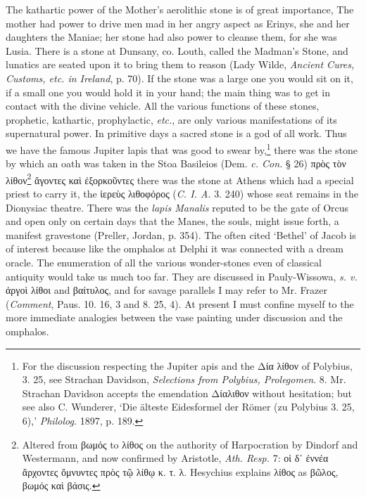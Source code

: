 \documentclass[a4paper, 11pt, oneside, polutonikogreek, english]{article}
\begin{document}
The kathartic power of the Mother's aerolithic stone is of great importance, The mother had power to drive men mad in her angry aspect as Erinys, she and her daughters the Maniae; her stone had also power to cleanse them, for she was Lusia. There is a stone at Dunsany, co. Louth, called the Madman's Stone, and lunatics are seated upon it to bring them to reason (Lady Wilde, \emph{Ancient Cures, Customs, etc. in Ireland}, p. 70). If the stone was a large one you would sit on it, if a small one you would hold it in your hand; the main thing was to get in contact with the divine vehicle. All the various functions of these stones, prophetic, kathartic, prophylactic, \emph{etc.}, are only various manifestations of its supernatural power. In primitive days a sacred stone is a god of all work. Thus we have the famous Jupiter lapis that was good to swear by,\footnote{For the discussion respecting the Jupiter apis and the Δία λίθον of Polybius, 3. 25, see Strachan Davidson, \emph{Selections from Polybius, Prolegomen}. 8. Mr. Strachan Davidson accepts the emendation Δίαλιθον without hesitation; but see also C. Wunderer, `Die älteste Eidesformel der Römer (zu Polybius 3. 25, 6),' \emph{Philolog.} 1897, p. 189.} there was the stone by which an oath was taken in the Stoa Basileios (Dem. \emph{c. Con.} § 26) πρὸς τὸν λίθον\footnote{Altered from βωμός to λίθος on the authority of Harpocration by Dindorf and Westermann, and now confirmed by Aristotle, \emph{Ath. Resp.} 7: οἱ δ᾽ ἐννέα ἄρχοντες ὄμνυντες πρὸς τῷ λίθῳ κ. τ. λ. Hesychius explains λίθος as βῶλος, βωμός καὶ βάσις.} ἄγοντες καὶ ἐξορκοῦντες there was the stone at Athens which had a special priest to carry it, the ἱερεὺς λιθοφόρος (\emph{C. I. A.} 3. 240) whose seat remains in the Dionysiac theatre. There was the \emph{lapis Manalis} reputed to be the gate of Orcus and open only on certain days that the Manes, the souls, might issue forth, a manifest gravestone (Preller, Jordan, p. 354). The often cited `Bethel' of Jacob is of interest because like the omphalos at Delphi it was connected with a dream oracle. The enumeration of all the various wonder-stones even of classical antiquity would take us much too far. They are discussed in Pauly-Wissowa, \emph{s. v.} ἀργοὶ λίθοι and βαίτυλος, and for savage parallels I may refer to Mr. Frazer (\emph{Comment}, Paus. 10. 16, 3 and 8. 25, 4). At present I must confine myself to the more immediate analogies between the vase painting under discussion and the omphalos.
\end{document}
